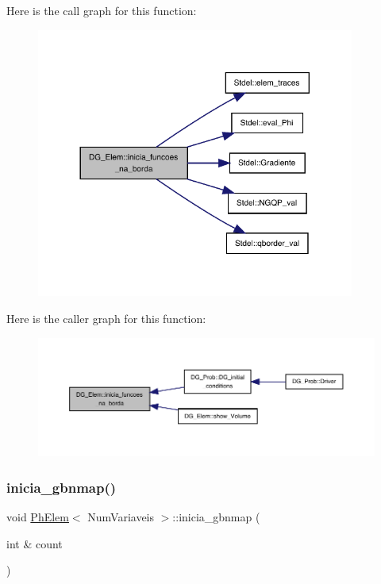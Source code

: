 Here is the call graph for this function\+:
\nopagebreak
\begin{figure}[H]
\begin{center}
\leavevmode
\includegraphics[width=296pt]{classDG__Elem_af61130ab38851fa2ade53f9e3f2418bc_cgraph}
\end{center}
\end{figure}
Here is the caller graph for this function\+:
\nopagebreak
\begin{figure}[H]
\begin{center}
\leavevmode
\includegraphics[width=350pt]{classDG__Elem_af61130ab38851fa2ade53f9e3f2418bc_icgraph}
\end{center}
\end{figure}
\mbox{\label{classPhElem_a98449dc77f691781f54fc8798bea03a3}} 
\subsubsection{\texorpdfstring{inicia\+\_\+gbnmap()}{inicia\_gbnmap()}\hspace{0.1cm}{\footnotesize\ttfamily [1/2]}}
{\footnotesize\ttfamily void \hyperlink{classPhElem}{Ph\+Elem}$<$ Num\+Variaveis $>$\+::inicia\+\_\+gbnmap (\begin{DoxyParamCaption}\item[{int \&}]{count }\end{DoxyParamCaption})\hspace{0.3cm}{\ttfamily [inherited]}}



